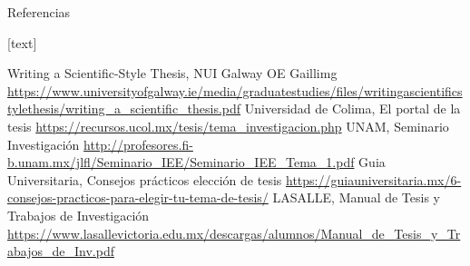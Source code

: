 \documentclass[
	11pt, %
]{beamer}
\begin{document}
\begin{frame}{Referencias}
  \begin{thebibliography}{10}
    [text]
    
    Writing a Scientific-Style Thesis, NUI Galway OE Gaillimg \url{https://www.universityofgalway.ie/media/graduatestudies/files/writingascientificstylethesis/writing_a_scientific_thesis.pdf}
    Universidad de Colima, El portal de la tesis \url{https://recursos.ucol.mx/tesis/tema_investigacion.php}
    UNAM, Seminario Investigación \url{http://profesores.fi-b.unam.mx/jlfl/Seminario_IEE/Seminario_IEE_Tema_1.pdf}
    Guia Universitaria, Consejos prácticos elección de tesis \url{https://guiauniversitaria.mx/6-consejos-practicos-para-elegir-tu-tema-de-tesis/}
    LASALLE, Manual de Tesis y Trabajos de Investigación \url{https://www.lasallevictoria.edu.mx/descargas/alumnos/Manual_de_Tesis_y_Trabajos_de_Inv.pdf}
  \end{thebibliography}
\end{frame}
\end{document}
